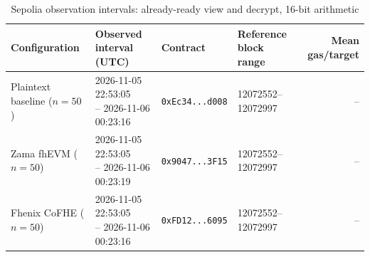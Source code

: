 \begin{table}[!t]
\caption{Sepolia observation intervals: already-ready view and decrypt, 16-bit arithmetic}
\label{tab:sepolia-view-decrypt-classic-euint16-primary}
\centering
\footnotesize
\setlength{\tabcolsep}{4pt}
\begin{tabular}{|l|l|l|l|r|}
\hline
\textbf{Configuration} &
\textbf{Observed interval (UTC)} &
\textbf{Contract} &
\textbf{Reference block range} &
\textbf{Mean gas/target} \\
\hline
Plaintext baseline (\(n=50\)) &
\shortstack[l]{2026-11-05 22:53:05 \\ -- 2026-11-06 00:23:16} &
\texttt{0xEc34...d008} &
12072552--12072997 &
-- \\
\hline
Zama fhEVM (\(n=50\)) &
\shortstack[l]{2026-11-05 22:53:05 \\ -- 2026-11-06 00:23:19} &
\texttt{0x9047...3F15} &
12072552--12072997 &
-- \\
\hline
Fhenix CoFHE (\(n=50\)) &
\shortstack[l]{2026-11-05 22:53:05 \\ -- 2026-11-06 00:23:16} &
\texttt{0xFD12...6095} &
12072552--12072997 &
-- \\
\hline
\end{tabular}
\end{table}
